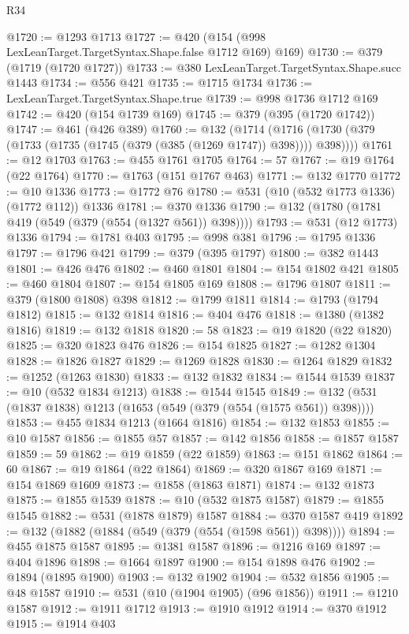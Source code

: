 \begin{lexlean}{R34}
\begin{coremodule}
@1720 := @1293 @1713
@1727 := @420 (@154 (@998 LexLeanTarget.TargetSyntax.Shape.false @1712 @169) @169)
@1730 := @379 (@1719 (@1720 @1727))
@1733 := @380 LexLeanTarget.TargetSyntax.Shape.succ @1443
@1734 := @556 @421
@1735 := @1715 @1734
@1736 := LexLeanTarget.TargetSyntax.Shape.true
@1739 := @998 @1736 @1712 @169
@1742 := @420 (@154 @1739 @169)
@1745 := @379 (@395 (@1720 @1742))
@1747 := @461 (@426 @389)
@1760 := @132
    (@1714 (@1716 (@1730 (@379 (@1733 (@1735 (@1745 (@379 (@385 (@1269 @1747)) @398)))) @398))))
@1761 := @12 @1703
@1763 := @455 @1761 @1705
@1764 := 57
@1767 := @19 @1764 (@22 @1764)
@1770 := @1763 (@151 @1767 @463)
@1771 := @132 @1770
@1772 := @10 @1336
@1773 := @1772 @76
@1780 := @531 (@10 (@532 @1773 @1336) (@1772 @112)) @1336
@1781 := @370 @1336
@1790 := @132 (@1780 (@1781 @419 (@549 (@379 (@554 (@1327 @561)) @398))))
@1793 := @531 (@12 @1773) @1336
@1794 := @1781 @403
@1795 := @998 @381
@1796 := @1795 @1336
@1797 := @1796 @421
@1799 := @379 (@395 @1797)
@1800 := @382 @1443
@1801 := @426 @476
@1802 := @460 @1801
@1804 := @154 @1802 @421
@1805 := @460 @1804
@1807 := @154 @1805 @169
@1808 := @1796 @1807
@1811 := @379 (@1800 @1808) @398
@1812 := @1799 @1811
@1814 := @1793 (@1794 @1812)
@1815 := @132 @1814
@1816 := @404 @476
@1818 := @1380 (@1382 @1816)
@1819 := @132 @1818
@1820 := 58
@1823 := @19 @1820 (@22 @1820)
@1825 := @320 @1823 @476
@1826 := @154 @1825
@1827 := @1282 @1304
@1828 := @1826 @1827
@1829 := @1269 @1828
@1830 := @1264 @1829
@1832 := @1252 (@1263 @1830)
@1833 := @132 @1832
@1834 := @1544 @1539
@1837 := @10 (@532 @1834 @1213)
@1838 := @1544 @1545
@1849 := @132 (@531 (@1837 @1838) @1213 (@1653 (@549 (@379 (@554 (@1575 @561)) @398))))
@1853 := @455 @1834 @1213 (@1664 @1816)
@1854 := @132 @1853
@1855 := @10 @1587
@1856 := @1855 @57
@1857 := @142 @1856
@1858 := @1857 @1587
@1859 := 59
@1862 := @19 @1859 (@22 @1859)
@1863 := @151 @1862
@1864 := 60
@1867 := @19 @1864 (@22 @1864)
@1869 := @320 @1867 @169
@1871 := @154 @1869 @1609
@1873 := @1858 (@1863 @1871)
@1874 := @132 @1873
@1875 := @1855 @1539
@1878 := @10 (@532 @1875 @1587)
@1879 := @1855 @1545
@1882 := @531 (@1878 @1879) @1587
@1884 := @370 @1587 @419
@1892 := @132 (@1882 (@1884 (@549 (@379 (@554 (@1598 @561)) @398))))
@1894 := @455 @1875 @1587
@1895 := @1381 @1587
@1896 := @1216 @169
@1897 := @404 @1896
@1898 := @1664 @1897
@1900 := @154 @1898 @476
@1902 := @1894 (@1895 @1900)
@1903 := @132 @1902
@1904 := @532 @1856
@1905 := @48 @1587
@1910 := @531 (@10 (@1904 @1905) (@96 @1856))
@1911 := @1210 @1587
@1912 := @1911 @1712
@1913 := @1910 @1912
@1914 := @370 @1912
@1915 := @1914 @403

\end{coremodule}
\end{lexlean}
